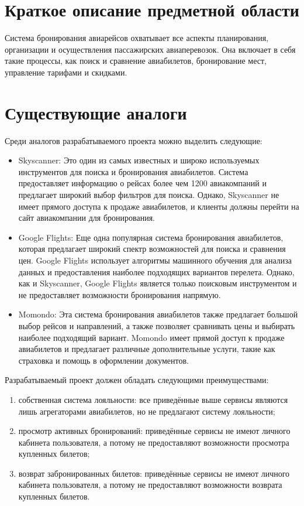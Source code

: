 \section{Краткое описание предметной области}

Система бронирования авиарейсов охватывает все аспекты планирования, организации и осуществления пассажирских авиаперевозок. Она включает в себя такие процессы, как поиск и сравнение авиабилетов, бронирование мест, управление тарифами и скидками.

\section{Существующие аналоги}


Среди аналогов разрабатываемого проекта можно выделить следующие:
\begin{itemize}
    \item Skyscanner: Это один из самых известных и широко используемых инструментов для поиска и бронирования авиабилетов. Система предоставляет информацию о рейсах более чем 1200 авиакомпаний и предлагает широкий выбор фильтров для поиска. Однако, Skyscanner не имеет прямого доступа к продаже авиабилетов, и клиенты должны перейти на сайт авиакомпании для бронирования.
    \item Google Flights: Еще одна популярная система бронирования авиабилетов, которая предлагает широкий спектр возможностей для поиска и сравнения цен. Google Flights использует алгоритмы машинного обучения для анализа данных и предоставления наиболее подходящих вариантов перелета. Однако, как и Skyscanner, Google Flights является только поисковым инструментом и не предоставляет возможности бронирования напрямую.
    \item Momondo: Эта система бронирования авиабилетов также предлагает большой выбор рейсов и направлений, а также позволяет сравнивать цены и выбирать наиболее подходящий вариант. Momondo имеет прямой доступ к продаже авиабилетов и предлагает различные дополнительные услуги, такие как страховка и помощь в оформлении документов.
\end{itemize}

Разрабатываемый проект должен обладать следующими преимуществами:
\begin{enumerate}
	\item собственная система лояльности: все приведённые выше сервисы являются лишь агрегаторами авиабилетов, но не предлагают систему лояльности;
	\item просмотр активных бронирований: приведённые сервисы не имеют личного кабинета пользователя, а потому не предоставляют возможности просмотра купленных билетов;
	\item возврат забронированных билетов: приведённые сервисы не имеют личного кабинета пользователя, а потому не предоставляют возможности возврата купленных билетов.
\end{enumerate}

